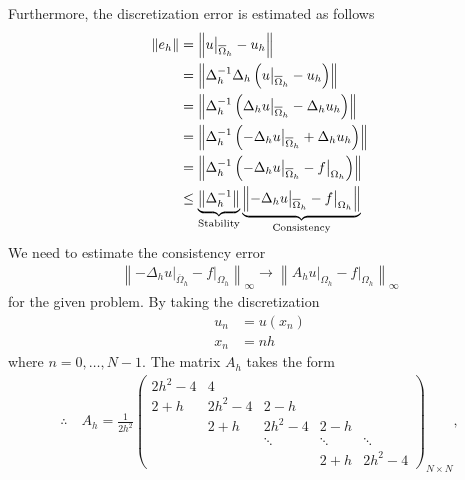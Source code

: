 \documentclass[12pt]{article}
\begin{document}
Furthermore, the discretization error is estimated as follows
\begin{align}
	\left\| e_{h} \right\| 
	 & = \left\| u\big|_{\overline{\Omega}_{h}} - u_{h} \right\|                                                           \notag \\
	 & = \left\| \Delta_{h}^{-1} \Delta_{h} \left( u\big|_{\overline{\Omega}_{h}} - u_{h} \right) \right\|                 \notag \\
	 & = \left\| \Delta_{h}^{-1} \left( \Delta_{h} u\big|_{\overline{\Omega}_{h}} - \Delta_{h} u_{h} \right) \right\|      \notag \\
	 & = \left\| \Delta_{h}^{-1} \left( - \Delta_{h} u\big|_{\overline{\Omega}_{h}} + \Delta_{h} u_{h} \right) \right\|    \notag \\
	 & = \left\| \Delta_{h}^{-1} \left( - \Delta_{h} u\big|_{\overline{\Omega}_{h}} - f\big|_{\Omega_{h}} \right) \right\| \notag \\
	 & \leq 
	\underbrace{\left\| \Delta_{h}^{-1} \right\| }_{\text{Stability}}
	\underbrace{\left\| - \Delta_{h} u\big|_{\overline{\Omega}_{h}} - f\big|_{\Omega_{h}} \right\| }
	_{\text{Consistency}}
\end{align}
We need to estimate the consistency error 
\begin{align}
	\label{eq:thisisnorm}
	\boxed{
	\left\| - \Delta_{h} u\big|_{\overline{\Omega}_{h}} - f\big|_{\Omega_{h}} \right\|_{\infty}
	\rightarrow
	\left\| A_{h} u\big|_{\Omega_{h}} - f\big|_{\Omega_{h}} \right\|_{\infty}
	}
\end{align}
for the given problem. 
\newpage
By taking the discretization
\begin{align}
	u_{n} & = u(x_{n}) \\
	x_{n} & = nh
\end{align}
where $n=0,\dots,N-1$.
The matrix $A_h$ takes the form
\begin{align}
	\label{eq:thisisA}
	\therefore\quad\boxed{
	A_h= \frac{1}{2h^2}
	\begin{pmatrix}
		2h^2-4 & 4      &        &        &        \\
		2+h    & 2h^2-4 & 2-h    &        &        \\
		       & 2+h    & 2h^2-4 & 2-h    &        \\
		       &        & \ddots & \ddots & \ddots \\
		       &        &        & 2+h    & 2h^2-4
	\end{pmatrix}_{N\times N},
	}
\end{align}
\end{document}
